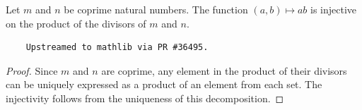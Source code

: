 \begin{theorem}
\label{divisors_mul_injective}
\leanok
Let $m$ and $n$ be coprime natural numbers. The function $(a,b) \mapsto ab$ is injective on the
    product of the divisors of $m$ and $n$.
    \begin{verbatim}
    Upstreamed to mathlib via PR #36495.
    \end{verbatim}
\end{theorem}
\begin{proof}
Since $m$ and $n$ are coprime, any element in the product of their divisors can be uniquely
    expressed as a product of an element from each set. The injectivity follows from the uniqueness
    of this decomposition.
\end{proof}
